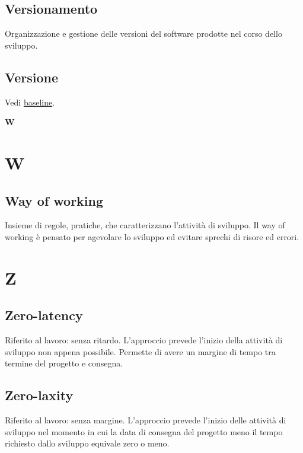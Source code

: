 	\subsection{Versionamento}
	\label{sec:versionamento}
	Organizzazione e gestione delle versioni del software prodotte nel corso dello sviluppo.

	\subsection{Versione}
	\label{sec:versione}
	Vedi \hyperref[sec:baseline]{baseline}. \newpage

	{\Huge{\textbf{W}}} \\
	\section{W}
	
	\subsection{Way of working}
	\label{sec:wow}
	Insieme di regole, pratiche, che caratterizzano l'attività di sviluppo. Il way of working è pensato per agevolare lo sviluppo ed evitare sprechi di risore ed errori. \newpage

	
	\section{Z}
	
	\subsection{Zero-latency}
	\label{sec:zerolatency}
	Riferito al lavoro: senza ritardo. L'approccio prevede l'inizio della attività di sviluppo non appena possibile. Permette di avere un margine di tempo tra termine del progetto e consegna.
	
	\subsection{Zero-laxity}
	\label{sec:zerolaxity}
	Riferito al lavoro: senza margine. L'approccio prevede l'inizio delle attività di sviluppo nel momento in cui la data di consegna del progetto meno il tempo richiesto dallo sviluppo equivale zero o meno. 
